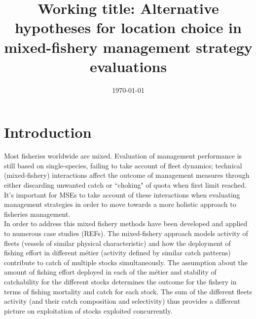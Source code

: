 \documentclass[12pt, halfline, a4paper]{ouparticle}
\begin{document}
\title{Working title: Alternative hypotheses for location choice in
	mixed-fishery management strategy evaluations}

\author{
	\address{GMIT}
	\address{CEFAS}
	\and
	\address{GMIT}
	\and
	\address{AZTI}
}


\date{\today}


\maketitle

\section{Introduction}
\label{intro}

Most fisheries worldwide are mixed. Evaluation of management performance is
still based on single-species, failing to take account of fleet dynamics;
technical (mixed-fishery) interactions affect the outcome of management
measures through either discarding unwanted catch or ``choking" of quota when
first limit reached. It's important for MSEs to take account of these
interactions when evaluating management strategies in order to move towards a
more holistic approach to fisheries management.  \\

In order to address this mixed fishery methods have been developed and applied
to numerous case studies (REFs). The mixed-fishery approach models activity of
fleets (vessels of similar physical characteristic) and how the deployment of
fishing effort in different métier (activity defined by similar catch patterns)
contribute to catch of multiple stocks simultaneously. The assumption about the
amount of fishing effort deployed in each of the métier and stability of
catchability for the different stocks determines the outcome for the fishery in
terms of fishing mortality and catch for each stock. The sum of the different
fleets activity (and their catch composition and selectivity) thus provides a
different picture on exploitation of stocks exploited concurrently. \\ 
\end{document}
